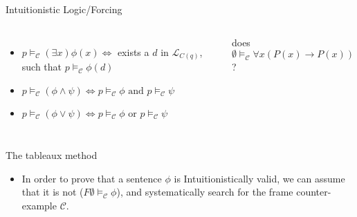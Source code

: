 \documentclass{beamer}
\begin{document}
\begin{frame}{Intuitionistic Logic/Forcing}
\begin{columns}
{\begin{itemize}
\item    \textcolor{black!30}{$ p \vDash_{\mathcal{C}} (\exists x) \phi(x)  \Leftrightarrow $  exists a $d$ in  $\mathcal{L}_{C(q)}$, such that $p \vDash_{\mathcal{C}} \phi(d)$}\\

\item    \textcolor{black!30}{$ p \vDash_{\mathcal{C}} (\phi \land \psi)    \Leftrightarrow p \vDash_{\mathcal{C}} \phi \text{ and } p \vDash_{\mathcal{C}} \psi$}\\

\item    \textcolor{black!30}{$ p \vDash_{\mathcal{C}} (\phi \lor \psi)     \Leftrightarrow p \vDash_{\mathcal{C}} \phi$ or $p \vDash_{\mathcal{C}} \psi$}\\




    \end{itemize}
}

    \rule{0.2mm}{\textheight} %

    \scriptsize{does $\emptyset \vDash_{\mathcal{C}} \forall x (P(x) \to P(x))$ } ?
    \newline
    \forcingExampleii



\end{columns}
\end{frame}










\begin{frame}{The tableaux method}
\begin{itemize}

    \item In order to prove that a sentence $\phi$ is Intuitionistically valid, we can assume that it is not ($F {\emptyset} \vDash_{\mathcal{C}} \phi$), and systematically search for the frame counter-example $\mathcal{C}$.

    \end{itemize}
\end{frame}
\end{document}
